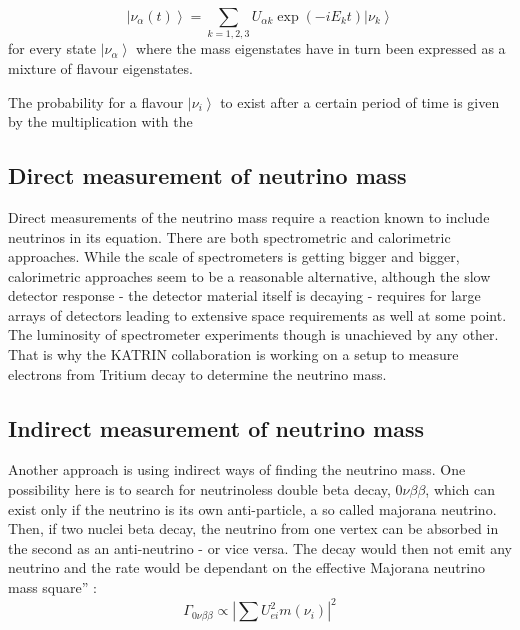 	\begin{equation}
		\left|\nu_\alpha(t)\right> = \sum_{k = 1,2,3} U_{\alpha k}\exp\left(-iE_k t\right)\left|\nu_k\right>
	\end{equation}
	for every state $\left|\nu_\alpha\right>$ where the mass eigenstates have in turn been expressed as a mixture of flavour eigenstates.

	The probability for a flavour $\left|\nu_i\right>$ to exist after a certain period of time is given by the multiplication with the 
	
    
    
    \subsection{Direct measurement of neutrino mass}
    \label{ch:Introduction:sec:Massive neutrino:subsec:direct Neutrino Mass measurement}
    Direct measurements of the neutrino mass require a reaction known to include neutrinos in its equation. There are both spectrometric and calorimetric approaches. While the scale of spectrometers is getting bigger and bigger, calorimetric approaches seem to be a reasonable alternative, although the slow detector response - the detector material itself is decaying - requires for large arrays of detectors leading to extensive space requirements as well at some point. The luminosity of spectrometer experiments though is unachieved by any other. That is why the KATRIN collaboration is working on a setup to measure electrons from Tritium decay to determine the neutrino mass. 
     
    \subsection{Indirect measurement of neutrino mass}
    \label{ch:Introduction:sec:Massive neutrino:subsec:indirect Neutrino Mass measurement}
    Another approach is using indirect ways of finding the neutrino mass. One possibility here is to search for neutrinoless double beta decay, $0\nu\beta\beta$, which can exist only if the neutrino is its own anti-particle, a so called majorana neutrino. Then, if two nuclei beta decay, the neutrino from one vertex can be absorbed in the second as an anti-neutrino - or vice versa. The decay would then not emit any neutrino and the rate would be dependant on the effective Majorana neutrino mass square'' \cite{currentNeutrinoSearches}:
    \begin{equation}
    	\Gamma_{0\nu\beta\beta} \propto \left| \sum{U_{ei}^2m\left(\nu_i\right)}\right|^2
    \end{equation}

